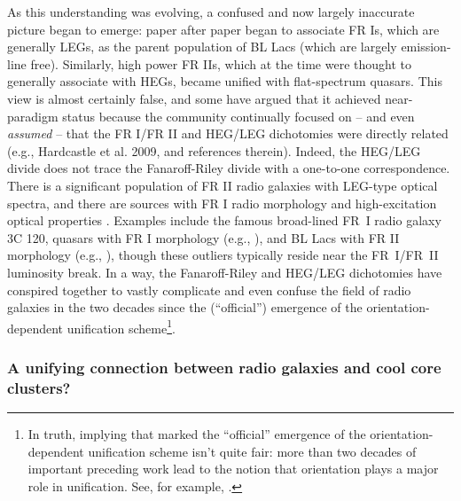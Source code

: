 As this understanding was evolving, a confused and now largely inaccurate picture began to emerge: 
paper after paper began to associate FR Is, which are generally LEGs, as the parent population of BL Lacs (which are largely emission-line free). Similarly, high power FR IIs, which at the time 
were thought to generally associate with HEGs, became unified with flat-spectrum quasars. 
This view is almost certainly false, and some have argued that it achieved near-paradigm status
because the community continually focused on -- and even {\it assumed} -- that the FR I/FR II and 
HEG/LEG dichotomies were directly related (e.g., Hardcastle et al. 2009, and references therein).  
Indeed, the HEG/LEG divide does not trace the Fanaroff-Riley divide with a one-to-one correspondence. 
There is a significant population of FR II radio galaxies with LEG-type optical spectra, and there are sources 
with FR I radio morphology and high-excitation optical properties \citep{hine79,barthel94,laing94,jackson97,chiaberge02,hardcastle04,whysong04}. Examples include the famous broad-lined FR~I 
radio galaxy 3C 120, quasars with FR I morphology (e.g., \citealt{blundell01}), and BL Lacs with 
FR II morphology (e.g., \citealt{rector01}), though these outliers typically reside near the FR~I/FR~II luminosity break. 
In a way, the Fanaroff-Riley and HEG/LEG dichotomies have conspired together to vastly complicate
and even confuse the field of radio galaxies in the two decades since the (``official'') 
emergence of the orientation-dependent unification scheme\footnote{In truth, implying that \citet{urry95} marked the ``official'' emergence of the orientation-dependent unification scheme isn't quite 
fair: more than two decades of important preceding work lead to the notion that 
orientation plays a major role in unification. See, for example, \citet{antonucci84}.}. 


\subsubsection{{\bf A unifying connection between radio galaxies and cool core clusters?}}

